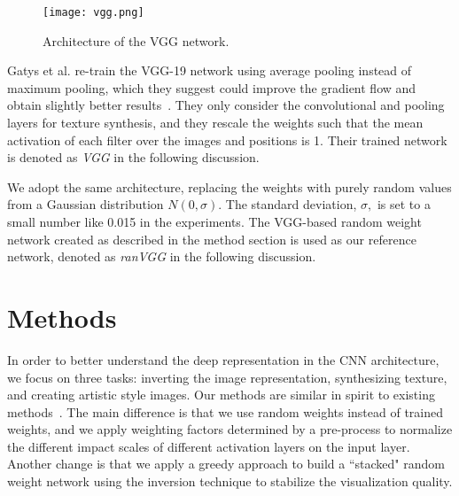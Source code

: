 \documentclass{article}
\begin{document}
\begin{figure}[htbp]
\centering
\vspace{-0.5em}
\texttt{[image: vgg.png]}
\vspace{-1em}
\caption{Architecture of the VGG network.}
\vspace{-0.5em}
\label{Fig:VGG}
\end{figure}

Gatys et al. re-train the VGG-19 network using average pooling instead of maximum pooling, which they suggest could improve the gradient flow and obtain slightly better results~\cite{Gatys2015texture}.
 They only consider the convolutional and pooling layers for texture synthesis, and they rescale the weights such that the mean activation of each filter over the images and positions is 1. Their trained network is denoted as \emph{VGG} in the following discussion.

We adopt the same architecture, replacing the weights with purely random values from a Gaussian distribution $N(0, \sigma)$. The standard deviation, $\sigma,$ is set to a small number like 0.015 in the experiments.
The VGG-based random weight network created as described in the method section is used as our reference network, denoted as \emph{ranVGG} in the following discussion.



\vspace{-0.5em}
\section{Methods}
\label{sec:methods}

In order to better understand the deep representation in the CNN architecture,
we focus on three tasks: inverting the image representation, synthesizing  texture, and creating artistic style images.
Our methods are similar in spirit to existing methods~\cite{Mahendran2015CVPR, Gatys2015texture,Gatys2015Style}.
The main difference is that we use random weights instead of trained weights, and we apply weighting factors determined by a pre-process to normalize the different impact scales of different activation layers on the input layer.
Another change is that we apply a greedy approach to build a ``stacked" random weight network using the inversion technique to stabilize the visualization quality.
\end{document}

